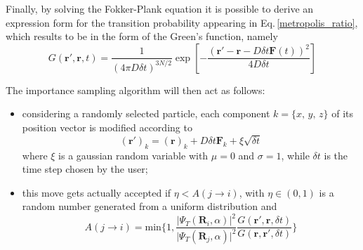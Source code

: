 Finally, by solving the Fokker-Plank equation it is possible to derive an expression form for the transition probability appearing in Eq.\,\ref{metropolis_ratio}, which results to be in the form of the Green's function, namely
\begin{equation*}
    G(\bm{r}', \bm{r}, t) = \frac{1}{\left (4 \pi D \delta t\right)^{3N/2}} \exp \left[ - \frac{ \left( \bm{r}' - \bm{r} - D\delta t \bm{F}(t)\right)^2}{4D\delta t}  \right]
\end{equation*}

The importance sampling algorithm will then act as follows:
\begin{itemize}
    \item considering a randomly selected particle, each  component $k = \{x,\,y,\,z\}$ of its position vector is modified according to
    \begin{equation*}
        (\bm{r}')_k = (\bm{r})_k + D \delta t \bm{F}_k + \xi \sqrt{\delta t}
    \end{equation*}
    where $\xi$ is a gaussian random variable with $\mu = 0$ and $\sigma=1$, while $\delta t$ is the time step chosen by the user;
    \item this move gets actually accepted if $\eta < A(j\rightarrow i)$, with $\eta \in (0,1)$ is a random number generated from a uniform distribution and
    \begin{equation*}
        A(j \rightarrow i) = \text{min} \bigg\{ 1, \frac{\vert \Psi_T(\bm{R}_i, \alpha)\vert^2}{\vert \Psi_T(\bm{R}_j, \alpha)\vert^2} \frac{G(\bm{r}', \bm{r}, \delta t)}{G(\bm{r}, \bm{r}', \delta t)} \bigg\}
    \end{equation*}
\end{itemize}

